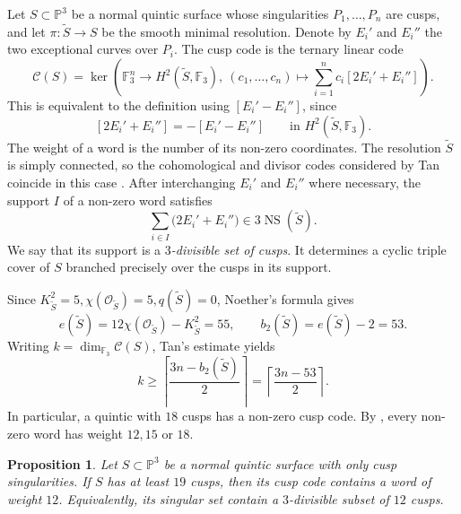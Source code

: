 \documentclass[10pt,a4paper]{article}
\newtheorem{proposition}[theorem]{Proposition}
\begin{document}
Let $S\subset\mathbb P^3$ be a normal quintic surface whose singularities $P_1,\ldots,P_n$ are
cusps, and let $\pi\colon \widetilde S\longrightarrow S$
be the smooth minimal resolution.  Denote by $E_i'$ and $E_i''$ the two exceptional
curves over $P_i$.  The cusp code is the ternary linear code
\[
 \mathcal C(S)=\ker\left(
        \mathbb F_3^n\longrightarrow H^2(\widetilde S,\mathbb F_3),
        \ (c_1,\ldots,c_n)\longmapsto
        \sum_{i=1}^n c_i[2E_i'+E_i'']
        \right).
\]
This is equivalent to the definition using $[E_i'-E_i'']$, since
\[
        [2E_i'+E_i'']=-[E_i'-E_i'']
        \qquad\text{in }H^2(\widetilde S,\mathbb F_3).
\]
The weight of a word is the number of its non-zero coordinates.  The
resolution $\widetilde S$ is simply connected, so the cohomological and
divisor codes considered by Tan coincide in this case
\cite[Section~3.2]{Tan_cusps}.  After interchanging $E_i'$ and
$E_i''$ where necessary, the support $I$ of a non-zero word satisfies
\[
        \sum_{i\in I}\bigl(2E_i'+E_i''\bigr)
        \in 3\operatorname{NS}(\widetilde S).
\]
We say that its support is a {\em $3$-divisible set of cusps}.  It determines
a cyclic triple cover of $S$ branched precisely over the cusps in its support.

Since $K_{\widetilde S}^2=5, \chi(\mathcal O_{\widetilde S})=5, q(\widetilde S)=0$,
Noether's formula gives
\[
        e(\widetilde S)
        =12\chi(\mathcal O_{\widetilde S})-K_{\widetilde S}^2=55,
        \qquad b_2(\widetilde S)=e(\widetilde S)-2=53.
\]
Writing $k=\dim_{\mathbb F_3}\mathcal C(S)$, Tan's estimate
\cite[Lemma~3.2.1]{Tan_cusps} yields
\begin{equation}
 \label{eq:code-dimension}
        k\geq
        \left\lceil\frac{3n-b_2(\widetilde S)}{2}\right\rceil
        =\left\lceil\frac{3n-53}{2}\right\rceil.
\end{equation}
In particular, a quintic with $18$ cusps has a non-zero cusp code.  By
\cite[Theorem~4.3.1]{Tan_cusps}, every non-zero word has weight $12, 15$ or $18$.

\begin{proposition}
 \label{prop:weight-twelve}
Let $S\subset\mathbb P^3$ be a normal quintic surface with only cusp
singularities.  If $S$ has at least $19$ cusps, then its cusp code contains a
word of weight $12$.  Equivalently, its singular set contain a $3$-divisible subset
of $12$ cusps.
\end{proposition}
\end{document}
